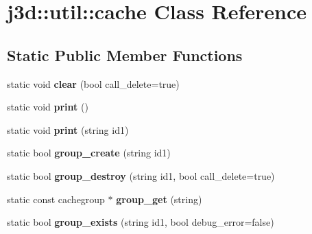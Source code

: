 \hypertarget{classj3d_1_1util_1_1cache}{}\section{j3d\+:\+:util\+:\+:cache Class Reference}
\label{classj3d_1_1util_1_1cache}
\subsection*{Static Public Member Functions}
\begin{DoxyCompactItemize}
\item 
\hypertarget{classj3d_1_1util_1_1cache_a96f343ab4828f8b9537cec69bd84fd4c}{}static void {\bfseries clear} (bool call\+\_\+delete=true)\label{classj3d_1_1util_1_1cache_a96f343ab4828f8b9537cec69bd84fd4c}

\item 
\hypertarget{classj3d_1_1util_1_1cache_a43981d5d139f32dfd36df2366750a2f6}{}static void {\bfseries print} ()\label{classj3d_1_1util_1_1cache_a43981d5d139f32dfd36df2366750a2f6}

\item 
\hypertarget{classj3d_1_1util_1_1cache_a4bcd27cfa97120b04ce21c0f6f083a6f}{}static void {\bfseries print} (string id1)\label{classj3d_1_1util_1_1cache_a4bcd27cfa97120b04ce21c0f6f083a6f}

\item 
\hypertarget{classj3d_1_1util_1_1cache_a3638eaa514148a2c54047c133e38f01e}{}static bool {\bfseries group\+\_\+create} (string id1)\label{classj3d_1_1util_1_1cache_a3638eaa514148a2c54047c133e38f01e}

\item 
\hypertarget{classj3d_1_1util_1_1cache_af47c71316da35ae99901d40d48e2e5e6}{}static bool {\bfseries group\+\_\+destroy} (string id1, bool call\+\_\+delete=true)\label{classj3d_1_1util_1_1cache_af47c71316da35ae99901d40d48e2e5e6}

\item 
\hypertarget{classj3d_1_1util_1_1cache_a7872ddb1634db41aa71d107251bffa43}{}static const cachegroup $\ast$ {\bfseries group\+\_\+get} (string)\label{classj3d_1_1util_1_1cache_a7872ddb1634db41aa71d107251bffa43}

\item 
\hypertarget{classj3d_1_1util_1_1cache_a07e2249e65a51168fc3e61f2debe6d16}{}static bool {\bfseries group\+\_\+exists} (string id1, bool debug\+\_\+error=false)\label{classj3d_1_1util_1_1cache_a07e2249e65a51168fc3e61f2debe6d16}


\end{DoxyCompactItemize}
